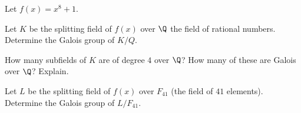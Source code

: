Let $f(x)=x^8+1$. 
\begin{alist}
\item Let $K$ be the splitting field of $f(x)$ over $\Q$
the field of rational numbers. Determine the Galois group of $K/Q$.
\item How many subfields of $K$ are of degree $4$ over $\Q$? How
many of these are Galois over $\Q$? Explain.
\item Let $L$ be the splitting field of $f(x)$ over $F_{41}$ (the field of
$41$ elements). Determine the Galois group of $L/F_{41}$.
\end{alist}
